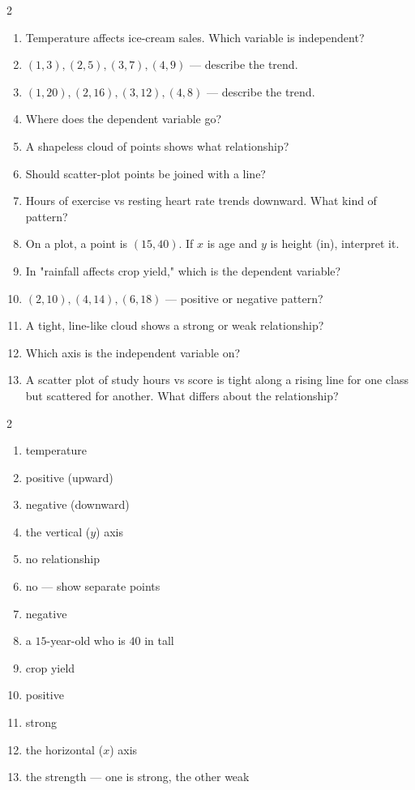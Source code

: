 \documentclass[11pt]{article}
\begin{document}
\begin{recapbox}
\begin{multicols}{2}
\small
\begin{enumerate}[leftmargin=*,itemsep=3pt]
  \item Temperature affects ice-cream sales. Which variable is independent?
  \item $(1,3),(2,5),(3,7),(4,9)$ — describe the trend.
  \item $(1,20),(2,16),(3,12),(4,8)$ — describe the trend.
  \item Where does the dependent variable go?
  \item A shapeless cloud of points shows what relationship?
  \item Should scatter-plot points be joined with a line?
  \item Hours of exercise vs resting heart rate trends downward. What kind of pattern?
  \item On a plot, a point is $(15, 40)$. If $x$ is age and $y$ is height (in), interpret it.
  \item In "rainfall affects crop yield," which is the dependent variable?
  \item $(2,10),(4,14),(6,18)$ — positive or negative pattern?
  \item A tight, line-like cloud shows a strong or weak relationship?
  \item Which axis is the independent variable on?
  \item A scatter plot of study hours vs score is tight along a rising line for one class but scattered for another. What differs about the relationship?
\end{enumerate}
\end{multicols}
\end{recapbox}

\begin{keybox}
\begin{multicols}{2}
\small
\begin{enumerate}[leftmargin=*,itemsep=3pt]
  \item temperature
  \item positive (upward)
  \item negative (downward)
  \item the vertical ($y$) axis
  \item no relationship
  \item no — show separate points
  \item negative
  \item a $15$-year-old who is $40$ in tall
  \item crop yield
  \item positive
  \item strong
  \item the horizontal ($x$) axis
  \item the strength — one is strong, the other weak
\end{enumerate}
\end{multicols}
\end{keybox}
\end{document}
